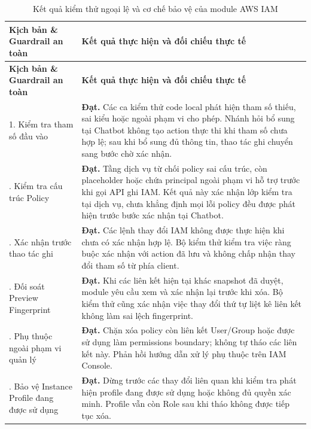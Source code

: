 \documentclass[a4paper,12pt]{article}
\begin{document}
\begingroup
\setlength{\tabcolsep}{6pt}
\renewcommand{\arraystretch}{1.15}
\fontsize{10.5}{14}\selectfont
\begin{longtable}{@{}
  >{\raggedright\arraybackslash}p{4.8cm}
  >{\raggedright\arraybackslash}p{\dimexpr\linewidth-4.8cm-2\tabcolsep\relax}@{}}
\caption{Kết quả kiểm thử ngoại lệ và cơ chế bảo vệ của module AWS IAM}
\label{tab:iam_exception_tests}\\
\toprule
\textbf{Kịch bản \& Guardrail an toàn} &
\textbf{Kết quả thực hiện và đối chiếu thực tế}\\
\midrule
\endfirsthead
\toprule
\textbf{Kịch bản \& Guardrail an toàn} &
\textbf{Kết quả thực hiện và đối chiếu thực tế}\\
\midrule
\endhead
\endfoot
\bottomrule
\endlastfoot

1. Kiểm tra tham số đầu vào &
\textbf{Đạt.} Các ca kiểm thử code local phát hiện tham số thiếu,
sai kiểu hoặc ngoài phạm vi cho phép. Nhánh hỏi bổ sung tại Chatbot
không tạo action thực thi khi tham số chưa hợp lệ; sau khi bổ sung
đủ thông tin, thao tác ghi chuyển sang bước chờ xác nhận.\\

2. Kiểm tra cấu trúc Policy &
\textbf{Đạt.} Tầng dịch vụ từ chối policy sai cấu trúc, còn placeholder
hoặc chứa principal ngoài phạm vi hỗ trợ trước khi gọi API ghi IAM.
Kết quả này xác nhận lớp kiểm tra tại dịch vụ, chưa khẳng định mọi
lỗi policy đều được phát hiện trước bước xác nhận tại Chatbot.\\

3. Xác nhận trước thao tác ghi &
\textbf{Đạt.} Các lệnh thay đổi IAM không được thực hiện khi chưa có
xác nhận hợp lệ. Bộ kiểm thử kiểm tra việc ràng buộc xác nhận với
action đã lưu và không chấp nhận thay đổi tham số từ phía client.\\

4. Đối soát Preview Fingerprint &
\textbf{Đạt.} Khi các liên kết hiện tại khác snapshot đã duyệt,
module yêu cầu xem và xác nhận lại trước khi xóa.
Bộ kiểm thử cũng xác nhận việc thay đổi thứ tự liệt kê liên kết
không làm sai lệch fingerprint.\\

5. Phụ thuộc ngoài phạm vi quản lý &
\textbf{Đạt.} Chặn xóa policy còn liên kết User/Group hoặc được
sử dụng làm permissions boundary; không tự tháo các liên kết này.
Phản hồi hướng dẫn xử lý phụ thuộc trên IAM Console.\\

6. Bảo vệ Instance Profile đang được sử dụng &
\textbf{Đạt.} Dừng trước các thay đổi liên quan khi kiểm tra phát hiện
profile đang được sử dụng hoặc không đủ quyền xác minh.
Profile vẫn còn Role sau khi tháo không được tiếp tục xóa.\\


\end{longtable}
\end{document}
